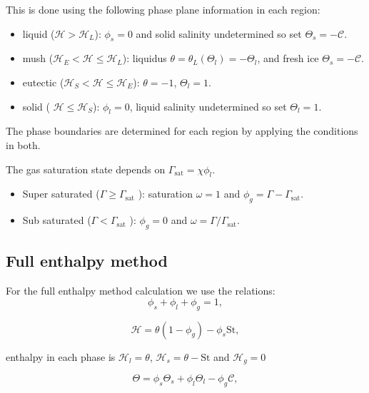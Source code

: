 \documentclass[a4paper,11pt]{article}
\numberwithin{equation}{section}
\begin{document}
This is done using the following phase plane information in each region:
\begin{itemize}
\item liquid ($\mathcal{H} >  \mathcal{H}_L$): $\phi_s = 0$ and solid salinity undetermined so set $\Theta_s = -\mathcal{C}$.
\item mush ($\mathcal{H}_E < \mathcal{H} \le  \mathcal{H}_L$): liquidus $\theta = \theta_L(\Theta_l) = - \Theta_l$,
and fresh ice $\Theta_s = - \mathcal{C}$.
\item eutectic ($\mathcal{H}_S < \mathcal{H} \le \mathcal{H}_E$): $\theta = -1$, $\Theta_l = 1$.
\item solid ( $\mathcal{H} \le \mathcal{H}_S$):  $\phi_l=0$, liquid salinity undetermined so set $\Theta_l=1$.
\end{itemize}

The phase boundaries are determined for each region by applying the conditions in both.

The gas saturation state depends on $\Gamma_{\text{sat}} = \chi \phi_l$.

\begin{itemize}
\item Super saturated ($\Gamma  \ge  \Gamma_{\text{sat}}$ ): saturation $\omega=1$ and $\phi_g = \Gamma - \Gamma_{\text{sat}}$.
\item Sub saturated ($\Gamma < \Gamma_{\text{sat}}$ ): $\phi_g=0$ and $\omega = \Gamma / \Gamma_{\text{sat}}$.
\end{itemize}

\subsection{Full enthalpy method}\label{sec:Full-enthalpy-method}
For the full enthalpy method calculation we use the relations:
\begin{equation}\label{eq:full-volume-sum}
\phi_s + \phi_l + \phi_g = 1,
\end{equation}

\begin{equation}\label{eq:full-bulk-enthalpy}
\mathcal{H} = \theta (1 - \phi_g) - \phi_s \text{St},
\end{equation}

enthalpy in each phase is $\mathcal{H}_l = \theta$, $\mathcal{H}_s = \theta - \text{St}$ and $\mathcal{H}_g=0$ 

\begin{equation}\label{eq:full-bulk-salinity}
\Theta = \phi_s \Theta_s + \phi_l \Theta_l - \phi_g \mathcal{C},
\end{equation}
\end{document}
